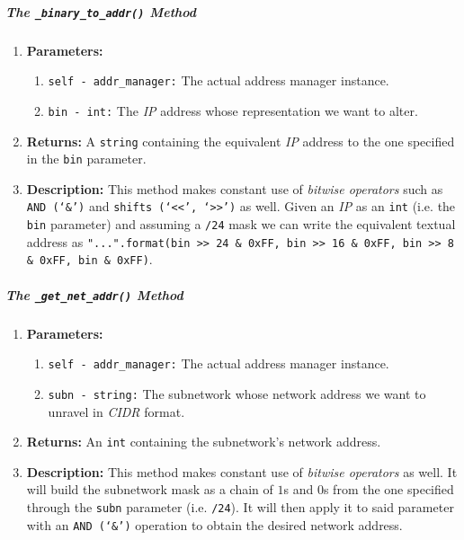         \subparagraph{The \texttt{\_binary\_to\_addr()} Method}
            \begin{enumerate}
                \item \textbf{Parameters:}
                \begin{enumerate}
                    \item \texttt{self - addr\_manager:} The actual address manager instance.
                    \item \texttt{bin - int:} The \textit{IP} address whose representation we want to alter.
                \end{enumerate}
                \item \textbf{Returns:} A \texttt{string} containing the equivalent \textit{IP} address to the one specified in the \texttt{bin} parameter.
                \item \textbf{Description:} This method makes constant use of \textit{bitwise operators} such as \texttt{AND (`\&')} and \texttt{shifts (`<<', `>>')} as well. Given an \textit{IP} as an \texttt{int} (i.e. the \texttt{bin} parameter) and assuming a \texttt{/24} mask we can write the equivalent textual address as \texttt{"{}.{}.{}.{}".format(bin >> 24 \& 0xFF, bin >> 16 \& 0xFF, bin >> 8 \& 0xFF, bin \& 0xFF)}.
            \end{enumerate}

        \subparagraph{The \texttt{\_get\_net\_addr()} Method}
            \begin{enumerate}
                \item \textbf{Parameters:}
                \begin{enumerate}
                    \item \texttt{self - addr\_manager:} The actual address manager instance.
                    \item \texttt{subn - string:} The subnetwork whose network address we want to unravel in \textit{CIDR} format.
                \end{enumerate}
                \item \textbf{Returns:} An \texttt{int} containing the subnetwork's network address.
                \item \textbf{Description:} This method makes constant use of \textit{bitwise operators} as well. It will build the subnetwork mask as a chain of $1$s and $0$s from the one specified through the \texttt{subn} parameter (i.e. \texttt{/24}). It will then apply it to said parameter with an \texttt{AND (`\&')} operation to obtain the desired network address.
            \end{enumerate}


